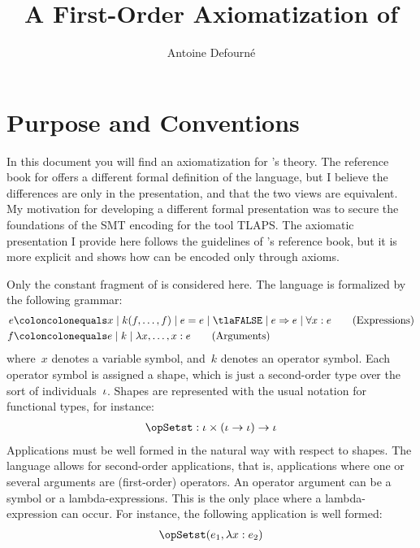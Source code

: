 \documentclass[11pt, a4paper, oneside]{article}
\title{A First-Order Axiomatization of \TLA}
\author{Antoine Defourné}
\date{}
\begin{document}
\pagestyle{empty}

\section{Purpose and Conventions}

In this document you will find an axiomatization for \TLA's theory.  The reference book for \TLA offers a different formal definition of the language, but I believe the differences are only in the presentation, and that the two views are equivalent.  My motivation for developing a different formal presentation was to secure the foundations of the SMT encoding for the tool TLAPS.  The axiomatic presentation I provide here follows the guidelines of \TLA's reference book, but it is more explicit and shows how \TLA can be encoded only through axioms.

Only the constant fragment of \TLA is considered here.  The language is formalized by the following grammar:
\begin{align*}
    e &\coloncolonequals x \mid k(f, \dots, f) \mid e = e \mid \tlaFALSE \mid e \imp e \mid \forall x : e\tag{Expressions} \\
    f &\coloncolonequals e \mid k \mid \lambda x, \dots, x : e \tag{Arguments}
\end{align*}
where~$x$ denotes a variable symbol, and~$k$ denotes an operator symbol.  Each operator symbol is assigned a shape, which is just a second-order type over the sort of individuals~$\iota$.  Shapes are represented with the usual notation for functional types, for instance:
\begin{align*}
    \opSetst : \idv \times (\idv \arr \idv) \arr \idv
\end{align*}
Applications must be well formed in the natural way with respect to shapes.  The language allows for second-order applications, that is, applications where one or several arguments are (first-order) operators.  An operator argument can be a symbol or a lambda-expressions.  This is the only place where a lambda-expression can occur.  For instance, the following application is well formed:
\begin{align*}
    \opSetst(e_1, \lambda x : e_2)
\end{align*}
\end{document}
